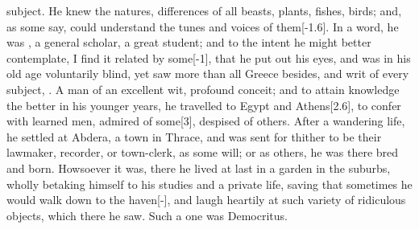 {subject. He knew the natures, differences of all beasts, plants,
fishes, birds; and, as some say, could understand the tunes and
voices of them[-1.6\baselineskip]. In a word, he was , a general scholar,
a great student; and to the intent he might better contemplate, I
find it related by some[-1\baselineskip], that he put out his eyes, and was in his old
age voluntarily blind, yet saw more than all Greece besides, and 
writ of every subject, . A man of an excellent wit, profound conceit; and to
attain knowledge the better in his younger years, he travelled to Egypt
and Athens[2.6\baselineskip], to confer with learned men, admired of some[3\baselineskip],
despised of others. After a wandering life, he settled at Abdera, a
town in Thrace, and was sent for thither to be their lawmaker,
recorder, or town-clerk, as some will; or as others, he was there bred
and born. Howsoever it was, there he lived at last in a garden in the
suburbs, wholly betaking himself to his studies and a private life,
saving that sometimes he would walk down to the haven[-\baselineskip], and
laugh heartily at such variety of ridiculous objects, which there he
saw. Such a one was Democritus.

}
